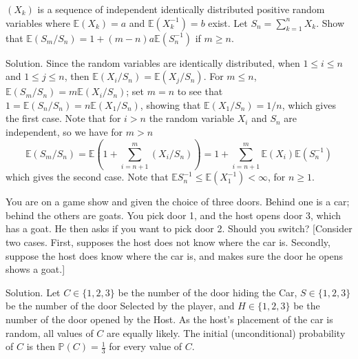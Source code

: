 \item $(X_k)$ is a sequence of independent identically distributed positive random variables where $\mathbb{E}(X_k)=a$ and $\mathbb{E}(X_k^{-1})=b$ exist. Let $S_n=\sum^n_{k=1}X_k$. Show that $\mathbb{E}(S_m/S_n)=1+(m-n)a\mathbb{E}(S_n^{-1})$ if $m\geq n$.

Solution. Since the random variables are identically distributed, when $1\leq i\leq n$ and $1\leq j\leq n$, then $\mathbb{E}(X_i/S_n)=\mathbb{E}(X_j/S_n)$. For $m\leq n$, $\mathbb{E}(S_m/S_n)=m\mathbb{E}(X_i/S_n)$; set $m=n$ to see that $1=\mathbb{E}(S_n/S_n)=n\mathbb{E}(X_1/S_n)$, showing that $\mathbb{E}(X_1/S_n)=1/n$, which gives the first case. Note that for $i>n$ the random variable $X_i$ and $S_n$ are independent, so we have for $m>n$
\begin{equation}
\mathbb{E}(S_m/S_n)=\mathbb{E}\left(1+\sum^m_{i=n+1}(X_i/S_n)\right) = 1+\sum^m_{i=n+1}\mathbb{E}(X_i)\mathbb{E}(S_n^{-1})
\end{equation}
which gives the second case. Note that $\mathbb{E}S_n^{-1}\leq \mathbb{E}(X_1^{-1})<\infty$, for $n\geq 1$.


\item You are on a game show and given the choice of three doors. Behind one is a car; behind the others are goats. You pick door 1, and the host opens door 3, which has a goat. He then asks if you want to pick door 2. Should you switch? [Consider two cases. First, supposes the host does not know where the car is. Secondly, suppose the host does know where the car is, and makes sure the door he opens shows a goat.]

Solution. Let $C \in \{1, 2, 3 \}$ be the number of the door hiding the Car, $S \in \{1, 2, 3 \}$ be the number of the door Selected by the player, and  $H \in \{1, 2, 3 \}$ be the number of the door opened by the Host. As the host's placement of the car is random, all values of $C$ are equally likely. The initial (unconditional) probability of $C$ is then $\mathbb{P}(C) = \tfrac 13$ for every value of $C$.

